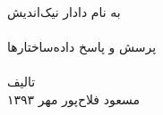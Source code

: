\begin{titlepage}
\begin{center}
\nastaliq
به نام دادار نیک‌اندیش\\
\vspace{10ex}
\hrulefill\\[0.3cm]
{\Huge
پرسش و پاسخ داده‌ساختارها
}\\[0.3cm]
\hrulefill\\
\vfill
تالیف
\\[0.4cm]
مسعود فلاح‌پور
\vfill
مهر ۱۳۹۳\\
\end{center}
\end{titlepage}